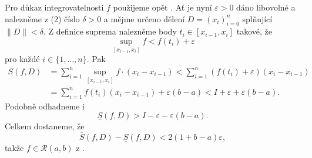 \begin{lemproof}
 Pro důkaz integrovatelnosti $f$ použijeme opět
 . Ať je nyní $\varepsilon>0$
 dáno libovolné a nalezněme z (2) číslo $\delta>0$ a mějme určeno dělení $D =
 (x_i)_{i=0}^{n}$ splňující $\|D\|<\delta$. Z definice suprema nalezněme body
 $t_i \in [x_{i-1},x_i]$ takové, že
 \[
  \sup_{[x_{i-1},x_i]} f < f(t_i) + \varepsilon
 \]
 pro každé $i \in \{1,\ldots,n\}$. Pak
 \begin{align*}
  \overline{S}(f,D) &= \sum_{i = 1}^{n} \sup_{[x_{i-1},x_i]} f \cdot (x_i -
  x_{i-1}) < \sum_{i = 1}^{n} (f(t_i) + \varepsilon)(x_i - x_{i-1})\\
                    &= \sum_{i = 1}^{n} f(t_i)(x_i - x_{i-1}) + \varepsilon(b-a)
                    < I + \varepsilon + \varepsilon(b-a).
 \end{align*}
 Podobně odhadneme i
 \[
  \underline{S}(f,D) > I - \varepsilon - \varepsilon(b-a).
 \]
 Celkem dostaneme, že
 \[
  \overline{S}(f,D) - \underline{S}(f,D) < 2(1 + b - a)\varepsilon,
 \]
 takže $f \in \mathcal{R}(a,b)$ z
 .
\end{lemproof}

